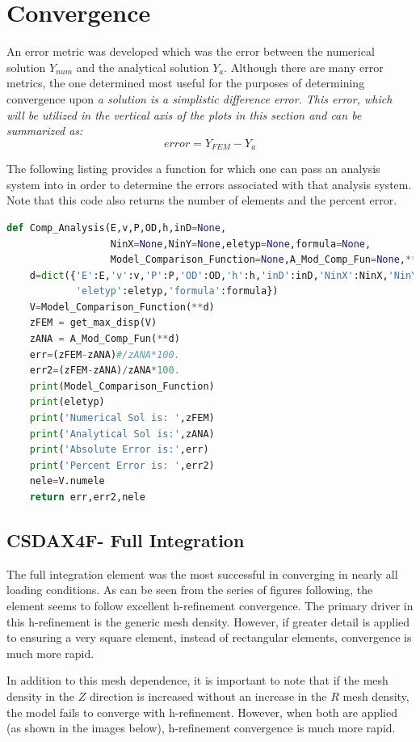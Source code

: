 \documentclass[10pt,letterpaper]{report}
\numberwithin{equation}{chapter}
\begin{document}
\section{Convergence}
An error metric was developed which was the error between the numerical solution $Y_{num}$ and the analytical solution $Y_{a}$. Although there are many error metrics, the one determined most useful for the purposes of determining convergence upon \it{a}  solution \normalfont is a simplistic difference error. This error, which will be utilized in the vertical axis of the plots in this section and can be summarized as:
\begin{equation}
error=Y_{FEM}-Y_{a}
\end{equation}

The following listing provides a function for which one can pass an analysis system into in order to determine the errors associated with that analysis system. Note that this code also returns the number of elements and the percent error.
\begin{lstlisting}[language=Python]
def Comp_Analysis(E,v,P,OD,h,inD=None,
                  NinX=None,NinY=None,eletyp=None,formula=None,
                  Model_Comparison_Function=None,A_Mod_Comp_Fun=None,**kwargs):
    d=dict({'E':E,'v':v,'P':P,'OD':OD,'h':h,'inD':inD,'NinX':NinX,'NinY':NinY,
            'eletyp':eletyp,'formula':formula})
    V=Model_Comparison_Function(**d)
    zFEM = get_max_disp(V)
    zANA = A_Mod_Comp_Fun(**d)
    err=(zFEM-zANA)#/zANA*100.
    err2=(zFEM-zANA)/zANA*100.
    print(Model_Comparison_Function)
    print(eletyp)
    print('Numerical Sol is: ',zFEM)
    print('Analytical Sol is:',zANA)
    print('Absolute Error is:',err)
    print('Percent Error is: ',err2)
    nele=V.numele
    return err,err2,nele
\end{lstlisting}

\subsection{CSDAX4F- Full Integration}
The full integration element was the most successful in converging in nearly all loading conditions. As can be seen from the series of figures following, the element seems to follow excellent h-refinement convergence. The primary driver in this h-refinement is the generic mesh density. However, if greater detail is applied to ensuring a very square element, instead of rectangular elements, convergence is much more rapid.

In addition to this mesh dependence, it is important to note that if the mesh density in the $Z$ direction is increased without an increase in the $R$ mesh density, the model fails to converge with h-refinement. However, when both are applied (as shown in the images below), h-refinement convergence is much more rapid. 
\end{document}
